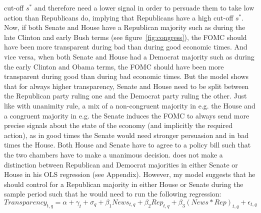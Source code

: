\documentclass[paper=a4,12pt,DIV=11,twoside=false]{scrartcl}
\begin{document}
cut-off $s^{*}$ and therefore need a lower signal in order to persuade them to take low action than Republicans do, implying that Republicans have a high cut-off $s^{*}$. Now, if both Senate and House have a Republican majority such as during the late Clinton and early Bush terms (see figure~\ref{fig:congress}), the FOMC should have been more transparent during bad than during good economic times. And vice versa, when both Senate and House had a Democrat majority such as during the early Clinton and Obama terms, the FOMC should have been more transparent during good than during bad economic times. But the model shows that for always higher transparency, Senate and House need to be split between the Republican party ruling one and the Democrat party ruling the other. Just like with unanimity rule, a mix of a non-congruent majority in e.g. the House and a congruent majority in e.g. the Senate induces the FOMC to always send more precise signals about the state of the economy (and implicitly the required action), as in good times the Senate would need stronger persuasion and in bad times the House. Both House and Senate have to agree to a policy bill such that the two chambers have to make a unanimous decision. \citet{GL2017} does not make a distinction between Republican and Democrat majorities in either Senate or House in his OLS regression (see Appendix). However, my model suggests that he should control for a Republican majority in either House or Senate during the sample period such that he would need to run the following regression:
\begin{equation*}
Transparency_{t,q}= \alpha + \gamma_{t} + \sigma_{q} + \beta_{1}News_{t,q} + \beta_{2}Rep_{t,q} + \beta_{3}(News*Rep)_{t,q} + \epsilon_{t,q}
\end{equation*}
\end{document}
